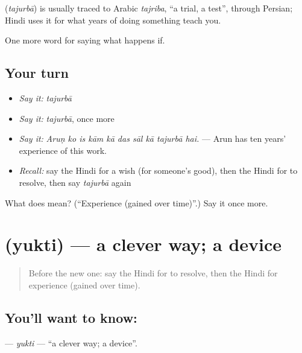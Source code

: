 \begin{cousinweb}
\textbf{} (\emph{tajurbā}) is usually traced to Arabic \emph{tajriba}, \textquotedblleft{}a trial, a test\textquotedblright{}, through Persian; Hindi uses it for what years of doing something teach you.
\end{cousinweb}

\begin{grammarlens}[title={What you've built}]
One more word for saying what happens if.
\end{grammarlens}

\subsection*{Your turn}
\begin{itemize}
\raggedright
  \item \emph{Say it:} \emph{tajurbā}
  \item \emph{Say it:} \emph{tajurbā}, once more
  \item \emph{Say it:} \emph{Aruṇ ko is kām kā das sāl kā tajurbā hai.} — Arun has ten years' experience of this work.
  \item \emph{Recall:} say the Hindi for a wish (for someone's good), then the Hindi for to resolve, then say \emph{tajurbā} again
\end{itemize}

\begin{tcolorbox}[breakable,colback=teal!4,colframe=teal!35!black,title={Before you move on}]
What does  mean? (\textquotedblleft{}Experience (gained over time)\textquotedblright{}.) Say it once more.
\end{tcolorbox}
\section[\texorpdfstring{\hi{युक्ति} (yukti)}{युक्ति (yukti)}]{ (yukti) — a clever way; a device}

\label{lesson:HI-C540-yukti}



\begin{quote}
Before the new one: say the Hindi for to resolve, then the Hindi for experience (gained over time).
\end{quote}

\subsection*{You'll want to know: }
\textbf{} — \emph{yukti} — \textquotedblleft{}a clever way; a device\textquotedblright{}.

